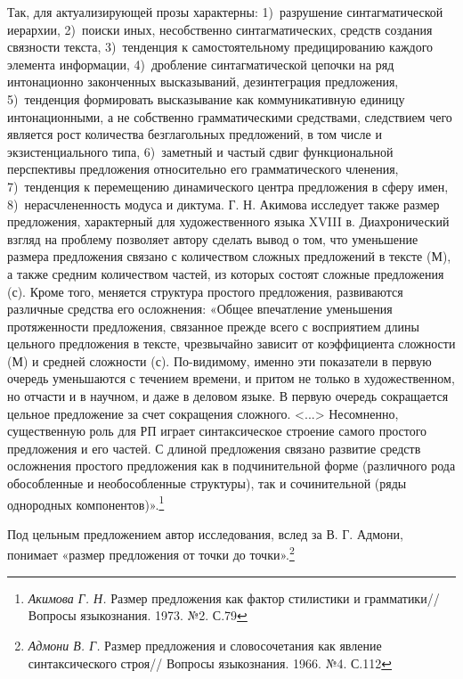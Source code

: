 \documentclass{kursa4}
\begin{document}
      Так, для актуализирующей прозы характерны: 1)~разрушение синтагматической иерархии, 2)~поиски иных, несобственно синтагматических, средств создания связности текста, 3)~тенденция к самостоятельному предицированию каждого элемента информации, 4)~дробление синтагматической цепочки на ряд интонационно законченных высказываний, дезинтеграция предложения, 5)~тенденция формировать высказывание как коммуникативную единицу интонационными, а не собственно грамматическими средствами, следствием чего является рост количества безглагольных предложений, в том числе и экзистенциального типа, 6)~заметный и частый сдвиг функциональной перспективы предложения относительно его грамматического членения, 7)~тенденция к перемещению динамического центра предложения в сферу имен, 8)~нерасчлененность модуса и диктума. Г. Н. Акимова исследует также размер предложения, характерный для художественного языка XVIII в. Диахронический взгляд на проблему позволяет автору сделать вывод о том, что уменьшение размера предложения связано с количеством сложных предложений в тексте (М), а также средним количеством частей, из которых состоят сложные предложения (с). Кроме того, меняется структура простого предложения, развиваются различные средства его осложнения: «Общее впечатление уменьшения протяженности предложения, связанное прежде всего с восприятием длины цельного предложения в тексте, чрезвычайно зависит от коэффициента сложности (М) и средней сложности (с). По-видимому, именно эти показатели в первую очередь уменьшаются с течением времени, и притом не только в художественном, но отчасти и в научном, и даже в деловом языке. В первую очередь сокращается цельное предложение за счет сокращения сложного. \textless{}...\textgreater{}
      Несомненно, существенную роль для РП играет синтаксическое строение самого простого предложения и его частей. С длиной предложения связано развитие средств осложнения простого предложения как в подчинительной форме (различного рода обособленные и необособленные структуры), так и сочинительной (ряды однородных компонентов)».\footnote{\textit{{ Акимова Г. Н. }}{Размер предложения как фактор стилистики и грамматики// Вопросы языкознания. 1973. №2. С.79}} 

      Под цельным предложением автор исследования, вслед за В. Г. Адмони, понимает «размер предложения от точки до точки».\footnote{\textit{{ Адмони В. Г.}}{ Размер предложения и словосочетания как явление синтаксического строя// Вопросы языкознания. 1966. №4. С.112}}
\end{document}
